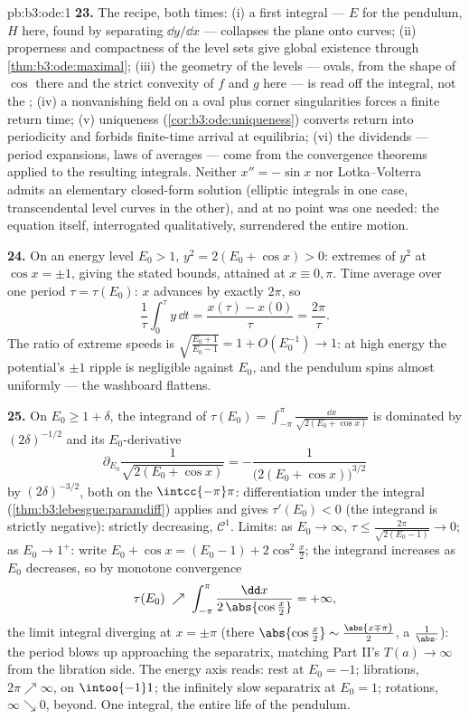 \begin{solution}{pb:b3:ode:1}
\textbf{23.} The recipe, both times: (i) a first integral
--- $E$ for the pendulum, $H$ here, found by separating
$\dd y/\dd x$ --- collapses the plane onto curves; (ii)
properness and compactness of the level sets give global
existence through \cref{thm:b3:ode:maximal}; (iii) the
geometry of the levels --- ovals, from the shape of $\cos$
there and the strict convexity of $f$ and $g$ here --- is
read off the integral, not the ; (iv) a nonvanishing
field on a  oval plus  corner singularities
forces a finite return time; (v) uniqueness
(\cref{cor:b3:ode:uniqueness}) converts return into
periodicity and forbids finite-time arrival at equilibria;
(vi) the dividends --- period expansions, laws of averages
--- come from the convergence theorems applied to the
resulting integrals. Neither $x'' = -\sin x$ nor
Lotka--Volterra admits an elementary closed-form solution
(elliptic integrals in one case, transcendental level curves
in the other), and at no point was one needed: the equation
itself, interrogated qualitatively, surrendered the entire
motion.

\textbf{24.} On an energy level $E_0 > 1$, $y^2 = 2(E_0 +
\cos x) > 0$: extremes of $y^2$ at $\cos x = \pm1$, giving
the stated bounds, attained at $x \equiv 0, \pi$. Time
average over one period $\tau = \tau(E_0)$: $x$ advances by
exactly $2\pi$, so
\[
\frac1\tau\int_0^\tau y\,\dd t = \frac{x(\tau) -
x(0)}{\tau} = \frac{2\pi}\tau .
\]
The ratio of extreme speeds is $\sqrt{\frac{E_0 + 1}{E_0 -
1}} = 1 + O(E_0^{-1}) \to 1$: at high energy the potential's
$\pm1$ ripple is negligible against $E_0$, and the pendulum
spins almost uniformly --- the washboard flattens.

\textbf{25.} On $E_0 \geq 1 + \delta$, the integrand of
$\tau(E_0) = \int_{-\pi}^{\pi}\frac{\dd x}{\sqrt{2(E_0 +
\cos x)}}$ is dominated by $(2\delta)^{-1/2}$ and its
$E_0$-derivative
\[
\partial_{E_0}\frac1{\sqrt{2(E_0 + \cos x)}}
= -\frac{1}{\bigl(2(E_0 + \cos x)\bigr)^{3/2}}
\]
by $(2\delta)^{-3/2}$, both  on the 
$\intcc{-\pi}\pi$: differentiation under the integral
(\cref{thm:b3:lebesgue:paramdiff}) applies and gives
$\tau'(E_0) < 0$ (the integrand is strictly negative):
strictly decreasing, $\mathcal C^1$. Limits: as $E_0 \to
\infty$, $\tau \leq \frac{2\pi}{\sqrt{2(E_0 - 1)}} \to 0$;
as $E_0 \to 1^+$: write $E_0 + \cos x = (E_0 - 1) +
2\cos^2\frac x2$; the integrand increases as $E_0$
decreases, so by monotone convergence
\[
\tau(E_0) \;\nearrow\;
\int_{-\pi}^{\pi}\frac{\dd x}{2\,\abs{\cos\frac x2}}
= +\infty,
\]
the limit integral diverging at $x = \pm\pi$ (there
$\abs{\cos\frac x2} \sim \frac{\abs{x \mp \pi}}2$, a
 $\frac1{\abs\cdot}$): the period blows up
approaching the separatrix, matching Part II's $T(a) \to
\infty$ from the libration side. The energy
axis reads: rest at $E_0 = -1$; librations, $2\pi \nearrow
\infty$, on $\intoo{-1}1$; the infinitely slow separatrix at
$E_0 = 1$; rotations, $\infty \searrow 0$, beyond. One
integral, the entire life of the pendulum.
\end{solution}
